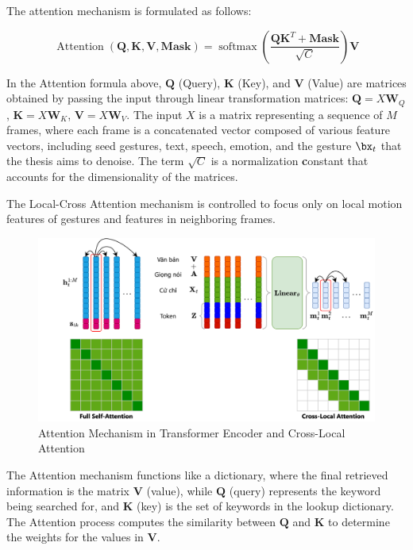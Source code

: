 The attention mechanism is formulated as follows:

\begin{equation} \label{eq:attention}
	\operatorname{Attention}(\mathbf{Q}, \mathbf{K}, \mathbf{V}, \mathbf{Mask})=\operatorname{softmax}\left(\frac{\mathbf{Q} \mathbf{K}^{T}+\mathbf{Mask}}{\sqrt{C}}\right) \mathbf{V}
\end{equation}

In the Attention formula above, $\mathbf{Q}$ (Query), $\mathbf{K}$ (Key), and $\mathbf{V}$ (Value) are matrices obtained by passing the input through linear transformation matrices: $\mathbf{Q} = {X} \mathbf{W}_Q$, $\mathbf{K} = {X} \mathbf{W}_K$, $\mathbf{V} = {X} \mathbf{W}_V$. The input $X$ is a matrix representing a sequence of $M$ frames, where each frame is a concatenated vector composed of various feature vectors, including seed gestures, text, speech, emotion, and the gesture $\bx_t$ that the thesis aims to denoise. The term $\sqrt{C}$ is a normalization \textbf{c}onstant that accounts for the dimensionality of the matrices. 

The Local-Cross Attention mechanism is controlled to focus only on local motion features of gestures and features in neighboring frames.

\begin{figure}[H][width=\linewidth]
	\centering
	\includegraphics[width=1\textwidth]{images/CrossLocalAttention}
	\caption{Attention Mechanism in Transformer Encoder and Cross-Local Attention}
	\label{fig:CrossLocalAttention}
\end{figure}

The Attention mechanism functions like a dictionary, where the final retrieved information is the matrix $\mathbf{V}$ (value), while $\mathbf{Q}$ (query) represents the keyword being searched for, and $\mathbf{K}$ (key) is the set of keywords in the lookup dictionary. The Attention process computes the similarity between \( \mathbf{Q} \) and \( \mathbf{K} \) to determine the weights for the values in \( \mathbf{V} \).

